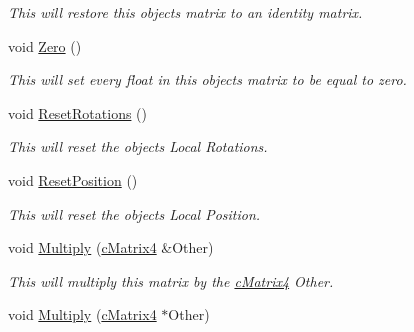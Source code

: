 \begin{DoxyCompactItemize}
\begin{DoxyCompactList}\small\item\em This will restore this objects matrix to an identity matrix. \end{DoxyCompactList}\item 
\hypertarget{classc_matrix4_acf16f37d849137d2e410ec20f2b4e74d}{
void \hyperlink{classc_matrix4_acf16f37d849137d2e410ec20f2b4e74d}{Zero} ()}
\label{classc_matrix4_acf16f37d849137d2e410ec20f2b4e74d}

\begin{DoxyCompactList}\small\item\em This will set every float in this objects matrix to be equal to zero. \end{DoxyCompactList}\item 
\hypertarget{classc_matrix4_a0d04302f66eb8afc0f2e8d7b880a0873}{
void \hyperlink{classc_matrix4_a0d04302f66eb8afc0f2e8d7b880a0873}{ResetRotations} ()}
\label{classc_matrix4_a0d04302f66eb8afc0f2e8d7b880a0873}

\begin{DoxyCompactList}\small\item\em This will reset the objects Local Rotations. \end{DoxyCompactList}\item 
\hypertarget{classc_matrix4_ac8048c00e45627f5910271ad8eb24c80}{
void \hyperlink{classc_matrix4_ac8048c00e45627f5910271ad8eb24c80}{ResetPosition} ()}
\label{classc_matrix4_ac8048c00e45627f5910271ad8eb24c80}

\begin{DoxyCompactList}\small\item\em This will reset the objects Local Position. \end{DoxyCompactList}\item 
\hypertarget{classc_matrix4_afc8fe82a6dfb40e77abc3117d10c18e5}{
void \hyperlink{classc_matrix4_afc8fe82a6dfb40e77abc3117d10c18e5}{Multiply} (\hyperlink{classc_matrix4}{cMatrix4} \&Other)}
\label{classc_matrix4_afc8fe82a6dfb40e77abc3117d10c18e5}

\begin{DoxyCompactList}\small\item\em This will multiply this matrix by the \hyperlink{classc_matrix4}{cMatrix4} Other. \end{DoxyCompactList}\item 
\hypertarget{classc_matrix4_aa36c01bc7f4f7a7ac47c1e154cd8a4ba}{
void \hyperlink{classc_matrix4_aa36c01bc7f4f7a7ac47c1e154cd8a4ba}{Multiply} (\hyperlink{classc_matrix4}{cMatrix4} $\ast$Other)}
\label{classc_matrix4_aa36c01bc7f4f7a7ac47c1e154cd8a4ba}


\end{DoxyCompactItemize}
